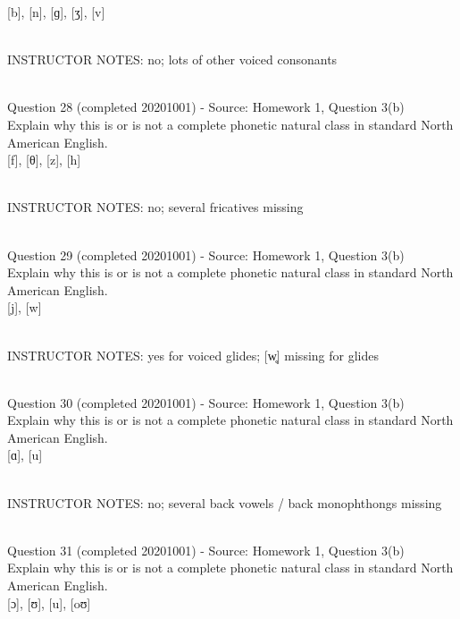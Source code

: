 \documentclass[12pt]{article}
\begin{document}
{[b]}, {[n]}, {[ɡ]}, {[ʒ]}, {[v]}


~\\
INSTRUCTOR NOTES: no; lots of other voiced consonants


~\\

{\large Question 28} (completed 20201001) - Source: Homework 1, Question 3(b)\\

Explain why this is or is not a complete phonetic natural class in standard North American English.\\

{[f]}, {[θ]}, {[z]}, {[h]}


~\\
INSTRUCTOR NOTES: no; several fricatives missing


~\\

{\large Question 29} (completed 20201001) - Source: Homework 1, Question 3(b)\\

Explain why this is or is not a complete phonetic natural class in standard North American English.\\

{[j]}, {[w]}


~\\
INSTRUCTOR NOTES: yes for voiced glides; [w̥] missing for glides


~\\

{\large Question 30} (completed 20201001) - Source: Homework 1, Question 3(b)\\

Explain why this is or is not a complete phonetic natural class in standard North American English.\\

{[ɑ]}, {[u]}


~\\
INSTRUCTOR NOTES: no; several back vowels / back monophthongs missing


~\\

{\large Question 31} (completed 20201001) - Source: Homework 1, Question 3(b)\\

Explain why this is or is not a complete phonetic natural class in standard North American English.\\

{[ɔ]}, {[ʊ]}, {[u]}, {[oʊ]}
\end{document}
